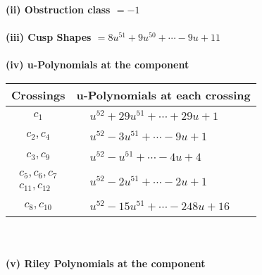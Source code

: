 \documentclass[1p]{elsarticle_modified}
\theoremstyle{definition}
\begin{document}
\flushleft \textbf{(ii) Obstruction class $= -1$}\\~\\
\flushleft \textbf{(iii) Cusp Shapes $= 8 u^{51}+9 u^{50}+\cdots-9 u+11$}\\~\\
\newpage\renewcommand{\arraystretch}{1}
\flushleft \textbf{(iv) u-Polynomials at the component}\newline \\
\begin{tabular}{m{50pt}|m{274pt}}
Crossings & \hspace{64pt}u-Polynomials at each crossing \\
\hline $$\begin{aligned}c_{1}\end{aligned}$$&$\begin{aligned}
&u^{52}+29 u^{51}+\cdots+29 u+1
\end{aligned}$\\
\hline $$\begin{aligned}c_{2},c_{4}\end{aligned}$$&$\begin{aligned}
&u^{52}-3 u^{51}+\cdots-9 u+1
\end{aligned}$\\
\hline $$\begin{aligned}c_{3},c_{9}\end{aligned}$$&$\begin{aligned}
&u^{52}- u^{51}+\cdots-4 u+4
\end{aligned}$\\
\hline $$\begin{aligned}c_{5},c_{6},c_{7}\\c_{11},c_{12}\end{aligned}$$&$\begin{aligned}
&u^{52}-2 u^{51}+\cdots-2 u+1
\end{aligned}$\\
\hline $$\begin{aligned}c_{8},c_{10}\end{aligned}$$&$\begin{aligned}
&u^{52}-15 u^{51}+\cdots-248 u+16
\end{aligned}$\\
\hline
\end{tabular}\\~\\
\newpage\renewcommand{\arraystretch}{1}
\flushleft \textbf{(v) Riley Polynomials at the component}\newline \\
\end{document}
